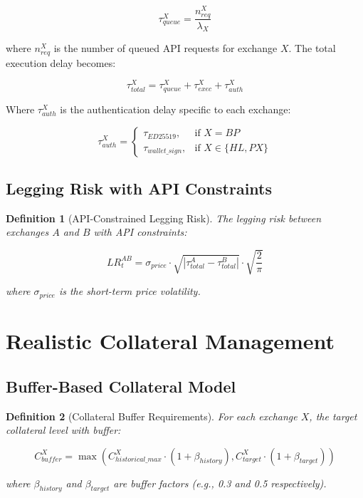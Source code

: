 \documentclass{article}
\newtheorem{definition}{Definition}
\begin{document}
\begin{equation}
\tau_{queue}^X = \frac{n^X_{req}}{\lambda_X}
\end{equation}

where $n^X_{req}$ is the number of queued API requests for exchange $X$. The total execution delay becomes:

\begin{equation}
\tau_{total}^X = \tau_{queue}^X + \tau_{exec}^X + \tau_{auth}^X
\end{equation}

Where $\tau_{auth}^X$ is the authentication delay specific to each exchange:

\begin{equation}
\tau_{auth}^X = \begin{cases}
\tau_{ED25519}, & \text{if } X = BP \\
\tau_{wallet\_sign}, & \text{if } X \in \{HL, PX\}
\end{cases}
\end{equation}

\subsection{Legging Risk with API Constraints}

\begin{definition}[API-Constrained Legging Risk]
The legging risk between exchanges $A$ and $B$ with API constraints:

\begin{equation}
LR^{AB}_t = \sigma_{price} \cdot \sqrt{|\tau_{total}^A - \tau_{total}^B|} \cdot \sqrt{\frac{2}{\pi}}
\end{equation}

where $\sigma_{price}$ is the short-term price volatility.
\end{definition}

\section{Realistic Collateral Management}

\subsection{Buffer-Based Collateral Model}

\begin{definition}[Collateral Buffer Requirements]
For each exchange $X$, the target collateral level with buffer:

\begin{equation}
C_{buffer}^X = \max(C_{historical\_max}^X \cdot (1 + \beta_{history}), C_{target}^X \cdot (1 + \beta_{target}))
\end{equation}

where $\beta_{history}$ and $\beta_{target}$ are buffer factors (e.g., 0.3 and 0.5 respectively).
\end{definition}
\end{document}
